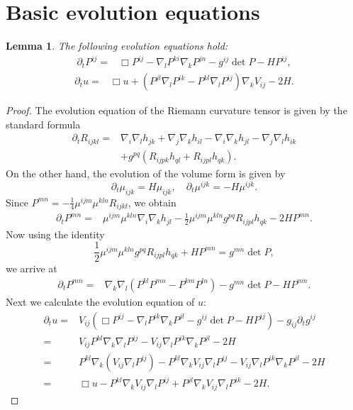 \documentclass{amsart}
\newtheorem{lemma}[theorem]{Lemma}
\theoremstyle{definition}
\theoremstyle{remark}
\numberwithin{equation}{section}
\begin{document}
\section{Basic evolution equations}
\begin{lemma}\label{ev u}
The following evolution equations hold:
\begin{align}
\partial_tP^{ij}=&\Box P^{ij}-\nabla_lP^{ki}\nabla_kP^{jn}-g^{ij}\det P-HP^{ij},
\end{align}
\begin{align}
\partial_t u=&\Box u+\left(P^{jl}\nabla_lP^{ik}-P^{kl}\nabla_l P^{ij}\right)\nabla_kV_{ij}-2H.
\end{align}
\end{lemma}
\begin{proof}
The evolution equation of the Riemann curvature tensor is given by the standard formula
\begin{align*}
\partial_t R_{ijkl}=&\nabla_i\nabla_lh_{jk}+\nabla_j\nabla_kh_{il}-\nabla_i\nabla_kh_{jl}-\nabla_j\nabla_lh_{ik}\\
&+g^{pq}(R_{ijpk}h_{ql}+R_{ijpl}h_{qk}).
\end{align*}
On the other hand, the evolution of the volume form is given by $$\partial_t\mu_{ijk}=H\mu_{ijk},\quad\partial_t\mu^{ijk}=-H\mu^{ijk}.$$
Since $P^{mn}=-\frac{1}{4}\mu^{ijm}\mu^{kln}R_{ijkl}$, we obtain
\begin{align*}
\partial_tP^{mn}=&\mu^{ijm}\mu^{kln}\nabla_i\nabla_kh_{jl}-\frac{1}{2}\mu^{ijm}\mu^{kln}g^{pq}R_{ijpl}h_{qk}-2HP^{mn}.
\end{align*}
Now using the identity
\[\frac{1}{2}\mu^{ijm}\mu^{kln}g^{pq}R_{ijpl}h_{qk}+HP^{mn}=g^{mn}\det P,\]
we arrive at
\begin{align*}
\partial_tP^{mn}=&\nabla_k\nabla_l(P^{kl}P^{mn}-P^{km}P^{ln})-g^{mn}\det P-HP^{mn}.
\end{align*}
Next we calculate the evolution equation of $u:$
\begin{align*}
\partial_t u=& V_{ij}\left(\Box P^{ij}-\nabla_lP^{ik}\nabla_kP^{jl}-g^{ij}\det P -HP^{ij}\right)- g_{ij}\partial_t g^{ij}\\
=&V_{ij}P^{kl}\nabla_k\nabla_lP^{ij}- V_{ij}\nabla_lP^{ik}\nabla_kP^{jl}-2H\\
=&P^{kl}\nabla_k\left(V_{ij}\nabla_lP^{ij}\right)-P^{kl}\nabla_k V_{ij}\nabla_l P^{ij}-V_{ij}\nabla_lP^{ik}\nabla_kP^{jl}-2H\\
=&\Box u-P^{kl}\nabla_k V_{ij}\nabla_l P^{ij}+P^{jl}\nabla_kV_{ij}\nabla_lP^{ik}-2H.
\end{align*}
\end{proof}
\end{document}
